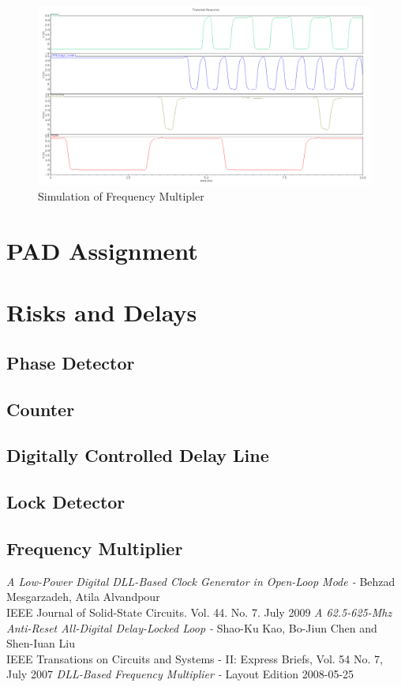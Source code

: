\documentclass[a4paper,12pt]{article} \usepackage{graphicx}
\begin{document}
\begin{figure}[p]
        \centering
        \includegraphics[width=\textwidth]{../Bilder/freq_mult_signals.png}
        \caption{Simulation of Frequency Multipler}
        \label{fig:freq_mult_signals}
\end{figure}

\section{PAD Assignment} %
\section{Risks and Delays}
\subsection{Phase Detector}
\subsection{Counter}
\subsection{Digitally Controlled Delay Line}
\subsection{Lock Detector}
\subsection{Frequency Multiplier}

\newpage 
\appendix 
\newpage

\begin{thebibliography}{99}
        \textit{A Low-Power Digital DLL-Based Clock Generator in Open-Loop Mode - }
                Behzad Mesgarzadeh, Atila Alvandpour \\
                IEEE Journal of Solid-State Circuits. Vol. 44. No. 7. July 2009
        \textit{A 62.5-625-Mhz Anti-Reset All-Digital Delay-Locked Loop - }
                Shao-Ku Kao, Bo-Jiun Chen and Shen-Iuan Liu \\
                IEEE Transations on Circuits and Systems - II: Express Briefs, Vol. 54 No. 7, July 2007
        \textit{DLL-Based Frequency Multiplier - }
                Layout Edition 2008-05-25 

\end{thebibliography}
\end{document}
